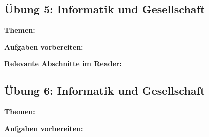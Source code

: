 \documentclass[a4paper]{article}%
\begin{document}
\pagebreak
\subsection{Übung 5: Informatik und Gesellschaft}


\textbf{Themen:}

\bigskip


\textbf{Aufgaben vorbereiten:}

\bigskip

\textbf{Relevante Abschnitte im Reader:}



\clearpage
\subsection{Übung 6: Informatik und Gesellschaft}


\textbf{Themen:}

\bigskip

\textbf{Aufgaben vorbereiten:}
\end{document}
